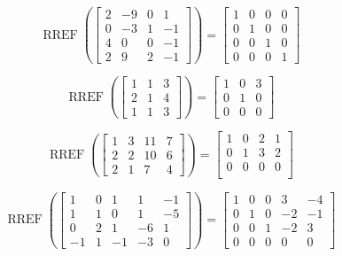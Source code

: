 \documentclass{article}
\DeclareMathOperator{\RREF}{RREF}
\begin{document}
  
      \[\RREF\left(
    \begin{bmatrix}
      2 & -9 & 0 & 1 \\
      0 & -3 & 1 & -1\\
     4 & 0 & 0 & -1\\
      2 & 9 & 2 & -1
    \end{bmatrix} \right)= \begin{bmatrix}
      1 & 0 & 0 & 0\\
      0 & 1 & 0 &0 \\
      0 & 0 & 1 & 0\\
      0 & 0 & 0 & 1
    \end{bmatrix}
  \]
  
  
     \[\RREF\left(
    \begin{bmatrix}
      1 & 1 & 3 \\
      2 & 1 & 4\\
     1& 1 & 3
    \end{bmatrix} \right)= \begin{bmatrix}
      1 & 0 & 3 \\
      0 & 1 & 0  \\
      0 & 0 & 0 
    \end{bmatrix}
  \]



	\[  \RREF\left(\begin{bmatrix}
    1 & 3 & 11 & 7 \\
    2 & 2 & 10 & 6 \\
    2 & 1 & 7 & 4 
  \end{bmatrix} \right) =
  \begin{bmatrix}
    1 & 0 & 2 & 1 \\
    0 & 1 & 3 & 2 \\
    0 & 0 & 0 & 0\\
  \end{bmatrix}
\]


\[  \RREF\left(\begin{bmatrix}
    1 & 0 & 1 & 1 & -1 \\
    1 & 1 & 0 & 1 & -5 \\
    0 & 2 & 1 & -6 & 1 \\
    -1 & 1 & -1 & -3 & 0 
  \end{bmatrix} \right) =
  \begin{bmatrix}
    1 & 0 & 0 & 3 & -4 \\
    0 & 1 & 0 & -2 & -1 \\
    0 & 0 & 1 & -2 & 3 \\
    0 & 0 & 0 & 0 & 0 
  \end{bmatrix}
\]
\end{document}

